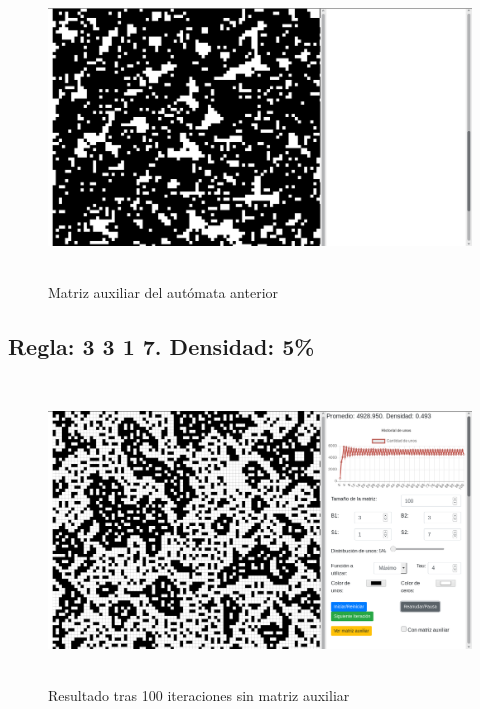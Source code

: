 \documentclass[12pt, titlepage]{article}
\begin{document}
\begin{figure}[H]
\begin{center}
 \includegraphics[width=15cm, height=8cm]{./img/3318-paridad-aux.png}
 \caption{Matriz auxiliar del autómata anterior}
 \label{fig:3318-paridad-aux}
\end{center}
\end{figure}

\subsection{Regla: 3 3 1 7. Densidad: 5\%}

\begin{figure}[H]
\begin{center}
 \includegraphics[width=15cm, height=8cm]{./img/3317.png}
 \caption{Resultado tras 100 iteraciones sin matriz auxiliar}
 \label{fig:3317}
\end{center}
\end{figure}
\end{document}

